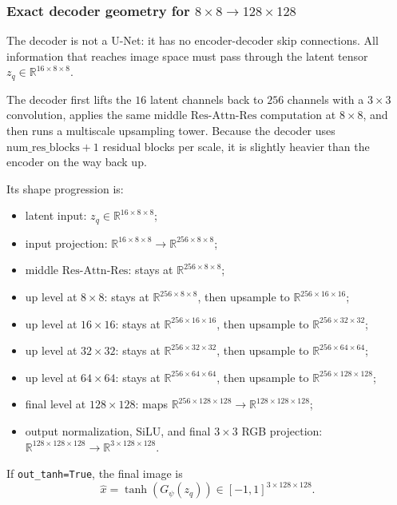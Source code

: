 \documentclass[11pt]{article}
\newcommand{\R}{\mathbb{R}}
\begin{document}
\subsubsection{Exact decoder geometry for $8 \times 8 \to 128 \times 128$}

The decoder is not a U-Net: it has no encoder-decoder skip connections. All information that reaches image space must pass through the latent tensor $z_q \in \R^{16 \times 8 \times 8}$.

The decoder first lifts the $16$ latent channels back to $256$ channels with a $3 \times 3$ convolution, applies the same middle $\mathrm{Res}$-$\mathrm{Attn}$-$\mathrm{Res}$ computation at $8 \times 8$, and then runs a multiscale upsampling tower. Because the decoder uses $\mathrm{num\_res\_blocks} + 1$ residual blocks per scale, it is slightly heavier than the encoder on the way back up.

Its shape progression is:
\begin{itemize}
  \item latent input: $z_q \in \R^{16 \times 8 \times 8}$;
  \item input projection: $\R^{16 \times 8 \times 8} \to \R^{256 \times 8 \times 8}$;
  \item middle $\mathrm{Res}$-$\mathrm{Attn}$-$\mathrm{Res}$: stays at $\R^{256 \times 8 \times 8}$;
  \item up level at $8 \times 8$: stays at $\R^{256 \times 8 \times 8}$, then upsample to $\R^{256 \times 16 \times 16}$;
  \item up level at $16 \times 16$: stays at $\R^{256 \times 16 \times 16}$, then upsample to $\R^{256 \times 32 \times 32}$;
  \item up level at $32 \times 32$: stays at $\R^{256 \times 32 \times 32}$, then upsample to $\R^{256 \times 64 \times 64}$;
  \item up level at $64 \times 64$: stays at $\R^{256 \times 64 \times 64}$, then upsample to $\R^{256 \times 128 \times 128}$;
  \item final level at $128 \times 128$: maps $\R^{256 \times 128 \times 128} \to \R^{128 \times 128 \times 128}$;
  \item output normalization, SiLU, and final $3 \times 3$ RGB projection: $\R^{128 \times 128 \times 128} \to \R^{3 \times 128 \times 128}$.
\end{itemize}

If \texttt{out\_tanh=True}, the final image is
\[
\hat x = \tanh(G_\psi(z_q)) \in [-1,1]^{3 \times 128 \times 128}.
\]
\end{document}
